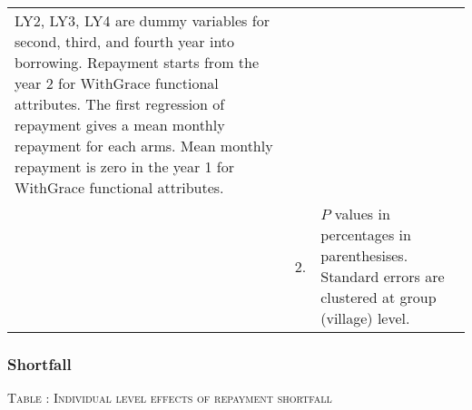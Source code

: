 \begin{minipage}[t]{14cm}
\begin{tabular}{>{\hfill\scriptsize}p{1cm}<{}>{\hfill\scriptsize}p{.25cm}<{}>{\scriptsize}p{12cm}<{\hfill}}
\textsf{LY2, LY3, LY4} are dummy variables for second, third, and fourth year into borrowing.  Repayment starts from the year 2 for \textsf{WithGrace} functional attributes. The first regression of repayment gives a mean monthly repayment for each arms. Mean monthly repayment is zero in the year 1 for \textsf{WithGrace} functional attributes.\\
& 2. & $P$ values in percentages in parenthesises. Standard errors are clustered at group (village) level.
\end{tabular}
\end{minipage}


\subsubsection{Shortfall}
\label{AppendixShortfall}

\hspace{-1cm}\begin{minipage}[t]{14cm}
\hfil\textsc{\normalsize Table \thetable: Individual level effects of repayment shortfall\label{tab shortfall indiv o800}}\\
\setlength{\tabcolsep}{1pt}
\setlength{\baselineskip}{8pt}
\renewcommand{\arraystretch}{.6}
\hfil{}
\end{minipage}

